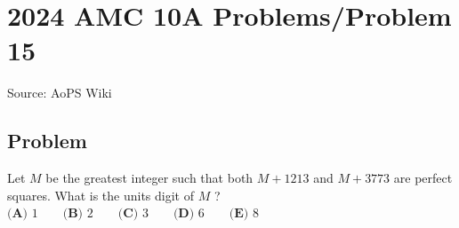 \documentclass[12pt]{article}
\begin{document}
\section*{{2024 AMC 10A Problems/Problem 15}}
Source: AoPS Wiki

\subsection*{Problem}
Let $M$ be the greatest integer such that both $M+1213$ and $M+3773$ are perfect squares. What is the units digit of $M$ ? $\textbf{(A) }1\qquad\textbf{(B) }2\qquad\textbf{(C) }3\qquad\textbf{(D) }6\qquad\textbf{(E) }8$
\end{document}
